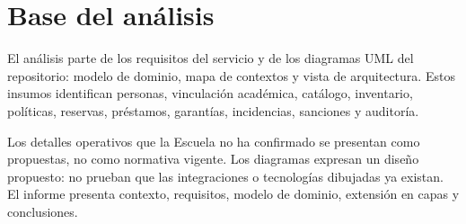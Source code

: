 \section{Base del an\'alisis}

El an\'alisis parte de los requisitos del servicio y de los diagramas UML del repositorio: modelo de dominio, mapa de contextos y vista de arquitectura. Estos insumos identifican personas, vinculaci\'on acad\'emica, cat\'alogo, inventario, pol\'iticas, reservas, pr\'estamos, garant\'ias, incidencias, sanciones y auditor\'ia.

Los detalles operativos que la Escuela no ha confirmado se presentan como propuestas, no como normativa vigente. Los diagramas expresan un dise\~no propuesto: no prueban que las integraciones o tecnolog\'ias dibujadas ya existan. El informe presenta contexto, requisitos, modelo de dominio, extensi\'on en capas y conclusiones.
